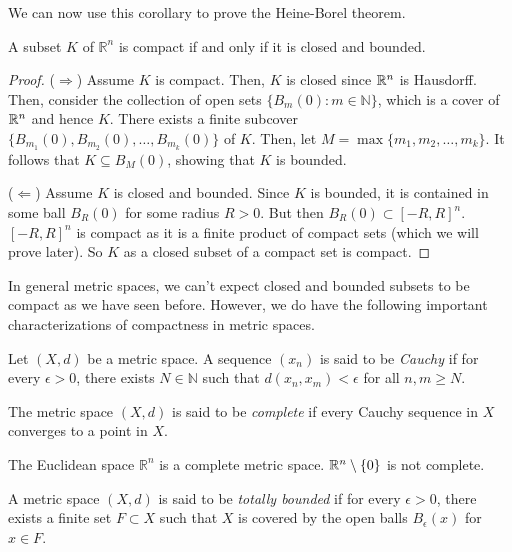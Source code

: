 We can now use this corollary to prove the Heine-Borel theorem.

\begin{theorem}
    A subset \(K\) of \(\mathbb{R}^n\) is compact if and only if it is closed and bounded.
\end{theorem}

\begin{proof}
    (\(\Rightarrow\)) Assume \(K\) is compact. Then, \(K\) is closed since $\mathbb{R}^n$ is Hausdorff. Then, consider the collection of open sets \(\{B_m(0) : m \in \mathbb{N}\}\), which is a cover of $\mathbb{R}^n$ and hence $K$. There exists a finite subcover \(\{B_{m_1}(0), B_{m_2}(0), \ldots, B_{m_k}(0)\}\) of \(K\). Then, let \(M = \max\{m_1, m_2, \ldots, m_k\}\). It follows that \(K \subseteq B_M(0)\), showing that \(K\) is bounded.

    (\(\Leftarrow\)) Assume \(K\) is closed and bounded. Since \(K\) is bounded, it is contained in some ball \(B_R(0)\) for some radius \(R > 0\). But then \(B_R(0)\subset [-R,R]^n\). $[-R,R]^n$ is compact as it is a finite product of compact sets (which we will prove later). So $K$ as a closed subset of a compact set is compact. 
\end{proof}

In general metric spaces, we can't expect closed and bounded subsets to be compact as we have seen before. However, we do have the following important characterizations of compactness in metric spaces.



\begin{definition}
    Let $(X,d)$ be a metric space. A sequence $(x_n)$ is said to be \emph{Cauchy} if for every $\epsilon>0$, there exists $N\in\mathbb{N}$ such that $d(x_n,x_m)<\epsilon$ for all $n,m\ge N$. 

    The metric space $(X,d)$ is said to be \emph{complete} if every Cauchy sequence in $X$ converges to a point in $X$.
\end{definition}


\begin{example}
    The Euclidean space $\mathbb{R}^n$ is a complete metric space. $\mathbb{R}^n\setminus\{0\}$ is not complete.
\end{example}

\begin{definition}
    A metric space $(X,d)$ is said to be \emph{totally bounded} if for every $\epsilon>0$, there exists a finite set $F\subset X$ such that $X$ is covered by the open balls $B_\epsilon(x)$ for $x\in F$.
\end{definition}


